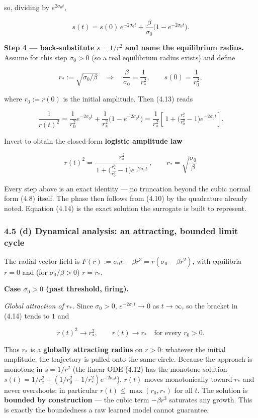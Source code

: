 \documentclass[
  11pt,
]{article}
\providecommand{\gt}{>}
\begin{document}
so, dividing by \(e^{2\sigma_0 t}\),

\[
s(t)=s(0)\,e^{-2\sigma_0 t}+\frac{\beta}{\sigma_0}\big(1-e^{-2\sigma_0 t}\big).
\tag{4.13}
\]

\textbf{Step 4 --- back‑substitute \(s=1/r^2\) and name the equilibrium
radius.} Assume for this step \(\sigma_0\gt 0\) (so a real equilibrium
radius exists) and define

\[
r_*:=\sqrt{\sigma_0/\beta}\quad\Longrightarrow\quad \frac{\beta}{\sigma_0}=\frac{1}{r_*^2},\qquad s(0)=\frac{1}{r_0^{2}},
\]

where \(r_0:=r(0)\) is the initial amplitude. Then (4.13) reads

\[
\frac{1}{r(t)^{2}}
=\frac{1}{r_0^{2}}e^{-2\sigma_0 t}+\frac{1}{r_*^{2}}\big(1-e^{-2\sigma_0 t}\big)
=\frac{1}{r_*^{2}}\left[\,1+\Big(\tfrac{r_*^{2}}{r_0^{2}}-1\Big)e^{-2\sigma_0 t}\right].
\]

Invert to obtain the closed‑form \textbf{logistic amplitude law}

\[
\boxed{\ \ r(t)^{2}=\frac{r_*^{2}}{\,1+\big(\tfrac{r_*^{2}}{r_0^{2}}-1\big)e^{-2\sigma_0 t}\,},
\qquad r_*=\sqrt{\dfrac{\sigma_0}{\beta}}\ \ }
\tag{4.14}
\]

Every step above is an exact identity --- no truncation beyond the cubic
normal form (4.8) itself. The phase then follows from (4.10) by the
quadrature already noted. Equation (4.14) is the exact solution the
surrogate is built to represent.

\subsubsection{4.5 (d) Dynamical analysis: an attracting, bounded limit
cycle}\label{d-dynamical-analysis-an-attracting-bounded-limit-cycle}

The radial vector field is
\(F(r):=\sigma_0 r-\beta r^3=r(\sigma_0-\beta r^2)\), with equilibria
\(r=0\) and (for \(\sigma_0/\beta\gt 0\)) \(r=r_*\).

\textbf{Case \(\sigma_0\gt 0\) (past threshold, firing).}

\emph{Global attraction of \(r_*\).} Since \(\sigma_0\gt 0\),
\(e^{-2\sigma_0 t}\to 0\) as \(t\to\infty\), so the bracket in (4.14)
tends to \(1\) and

\[
r(t)^2\longrightarrow r_*^2,\qquad r(t)\longrightarrow r_*
\quad\text{for every }r_0\gt 0 .
\]

Thus \(r_*\) is a \textbf{globally attracting radius} on \(r\gt 0\):
whatever the initial amplitude, the trajectory is pulled onto the same
circle. Because the approach is monotone in \(s=1/r^2\) (the linear ODE
(4.12) has the monotone solution
\(s(t)=1/r_*^2+(1/r_0^2-1/r_*^2)e^{-2\sigma_0 t}\)), \(r(t)\) moves
monotonically toward \(r_*\) and never overshoots; in particular
\(r(t)\le\max(r_0,r_*)\) for all \(t\). The solution is \textbf{bounded
by construction} --- the cubic term \(-\beta r^3\) saturates any growth.
This is exactly the boundedness a raw learned model cannot guarantee.
\end{document}
